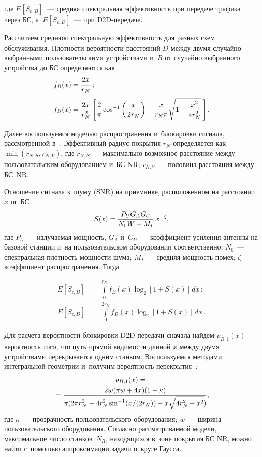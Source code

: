 \begin{multicols}{2}
\noindent
где $E[S_{e,B}]$~--- средняя спектральная эффективность при передаче трафика 
через БС, а~$E[S_{e,D}]$~--- при D2D-передаче.

Рассчитаем среднюю спектральную эффективность для разных схем обслуживания. 
Плотности вероятности расстояний $D$ между двумя случайно выбранными 
пользовательскими устройствами и~$B$ от случайно выбранного устройства до БС 
определяются как~\cite{moltchanov2012distance}
\begin{align*}
f_{B}(x)&=\displaystyle\frac{\displaystyle 2x\mathstrut}{\displaystyle r_N\mathstrut}\,;\\[3pt]
f_{D}(x)&=\displaystyle\frac{\displaystyle 2x\mathstrut}{\displaystyle r_N^2\mathstrut}\left[\displaystyle\frac{\displaystyle 2\mathstrut}{\displaystyle \pi\mathstrut}\cos^{-1}\left(\displaystyle\frac{\displaystyle x\mathstrut}{\displaystyle 2r_N\mathstrut}\right)-\displaystyle\frac{\displaystyle x\mathstrut}{\displaystyle r_N\pi\mathstrut}\sqrt{1-\displaystyle\frac{\displaystyle x^2\mathstrut}{\displaystyle 4r_N^2\mathstrut}}\,\right].
\end{align*}

Далее воспользуемся моделью распространения и~блокировки сигнала, рассмотренной 
в~\cite{ivanova2022performance}.
Эффективный радиус покрытия $r_N$ определяется как $\min(r_{N,S},r_{N,V})$, где 
$r_{N,S}$~--- максимально возможное расстояние между пользовательским 
оборудованием и~БС NR; $r_{N,V}$~--- половина расстояния меж\-ду БС~NR.

Отношение сигнала к~шуму (SNR) на приемнике, расположенном на расстоянии~$x$ от~БС
\begin{equation*}
S(x)=\displaystyle\frac{\displaystyle P_{U}G_{A}G_{U}\mathstrut}{\displaystyle N_0W+M_I\mathstrut}\,x^{-\zeta},
\end{equation*}
где $P_{U}$~--- излучаемая мощность; $G_{A}$ и~$G_{U}$~--- коэффициент усиления 
антенны на базовой станции и~на пользовательском оборудовании соответственно; 
$N_0$~--- спектральная плотность мощности шума; $M_I$~--- средняя мощность помех; 
$\zeta$~--- коэффициент распространения. Тогда

\noindent
\begin{align*}
E[S_{e,B}]&=\int\limits_{0}^{r_N}f_{B}(x)\log_{2}[1+S(x)]\,dx\,;\\
E[S_{e,D}]&=\int\limits_{0}^{2r_N}f_{D}(x)\log_{2}[1+S(x)]\,dx\,.
\end{align*}

Для расчета вероятности блокировки D2D-пе\-ре\-да\-чи сначала найдем $p_{B,1}(x)$~--- 
вероятность того, что путь прямой видимости длиной $x$ между двумя устройствами 
перекрывается одним станком. Воспользуемся методами интегральной геометрии 
и~получим вероятность перекрытия~\cite{santalo2004integral}:
\begin{multline*}
p_{B,1}(x)={}\\
{}=\displaystyle\frac{\displaystyle 2w(\pi{}w+4x) (1-\kappa)\mathstrut}{\displaystyle \pi(2\pi{}r_N^2-4r_N^2\sin^{-1}(x/(2r_N))-
x\sqrt{4r_N^2-x^2})\mathstrut},
\end{multline*}
где $\kappa$~--- прозрачность пользовательского оборудования; $w$~--- ширина 
пользовательского оборудования.
Согласно рассматриваемой модели, максимальное чис\-ло станков~$N_R$, находящихся 
в~зоне покрытия БС NR, можно найти с~по\-мощью аппроксимации задачи о~круге Гаусса.


\end{multicols}
